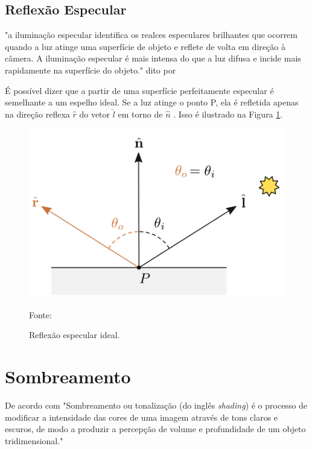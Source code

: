 \subsection{Reflexão Especular}

"a iluminação especular identifica os realces especulares brilhantes que ocorrem quando a luz atinge uma superfície de objeto e reflete de volta em direção à câmera. A iluminação especular é mais intensa do que a luz difusa e incide mais rapidamente na superfície do objeto." dito por \cite{Steven2022}

É possível dizer que a partir de  uma superfície perfeitamente especular é semelhante a um espelho ideal.  Se a luz atinge o ponto P, ela é refletida apenas na direção reflexa \begin{math}\hat{r}\end{math} do vetor \begin{math}\hat{l}\end{math}  em torno de \begin{math}\hat{n}\end{math} .  Isso é ilustrado na Figura \ref{fig:reflexão especular}.

\begin{figure}[ht]
	\caption{Reflexão especular ideal.}
	\centering
	\includegraphics[scale=0.7]{imagens/09_lighting14.png}

	Fonte: \cite{Harlen_Batagelo2021}
	\label{fig:reflexão especular}
\end{figure}

\section{Sombreamento}

De acordo com  "Sombreamento ou tonalização (do inglês \textit{shading}) é o processo de modificar a intensidade das cores de uma imagem através de tons claros e escuros, de modo a produzir a percepção de volume e profundidade de um objeto tridimensional."

